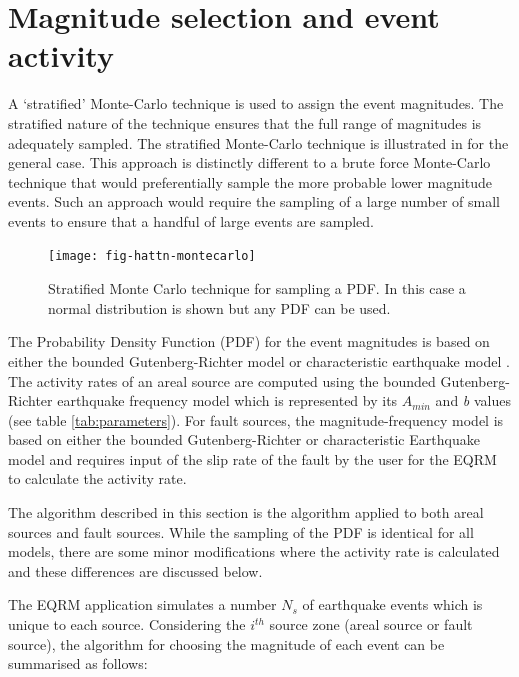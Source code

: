 \section{Magnitude selection and event activity}
\label{sec:magnitude_selection}

A `stratified' Monte-Carlo technique is used to assign the event
magnitudes. The stratified nature of the technique ensures that
the full range of magnitudes is adequately sampled. The stratified
Monte-Carlo technique is illustrated in
 for the general case. This approach is
distinctly different to a brute force Monte-Carlo technique that
would preferentially sample the more probable lower magnitude
events. Such an approach would require the sampling of a large
number of small events to ensure that a handful of large events
are sampled.


\begin{figure}[htp]
\texttt{[image: fig-hattn-montecarlo]}
\caption{Stratified Monte Carlo technique for sampling a PDF. In
this case a normal distribution is shown but any PDF can be used.}
\label{fig-hattn-montecarlo}
\end{figure}

The Probability Density Function (PDF) for the event magnitudes is
based on either the bounded Gutenberg-Richter model \citep{dr_Kramer96a} 
or characteristic earthquake model \citep{eqrm_Schwartz84}. The activity rates of an areal source are computed using the
bounded Gutenberg-Richter earthquake frequency model which is represented by its $A_{min}$ and \emph{b} values (see table \ref{tab:parameters}). 
For fault sources, the magnitude-frequency model is based on either the bounded Gutenberg-Richter or characteristic Earthquake model and 
requires input of the slip rate of the fault by the user for the EQRM to calculate the activity rate. 

The algorithm described in this section is the algorithm applied
to both areal sources and fault sources. While the sampling of the PDF is identical for all models, there are some minor modifications 
where the activity rate is calculated and these differences are discussed below. 

The EQRM application simulates a number $N_s$ of earthquake
events which is unique to each source. Considering the $i^{th}$ source zone (areal source or fault source), the algorithm for
choosing the magnitude of each event can be summarised as follows:

